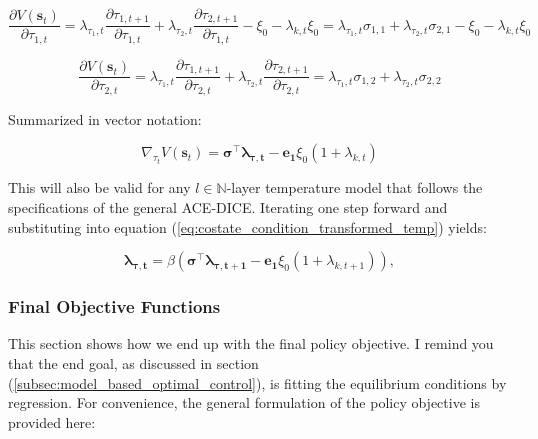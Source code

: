 \begin{equation*}
        \frac{\partial V(\bm{s}_t)}{\partial \tau_{1,t}} = 
            \lambda_{\tau_1,t}\frac{\partial \tau_{1,t+1}}{\partial \tau_{1,t}}
            + \lambda_{\tau_2,t}\frac{\partial \tau_{2,t+1}}{\partial \tau_{1,t}}
            -\xi_0 - \lambda_{k,t}\xi_0
        = \lambda_{\tau_1,t} \sigma_{1,1} + \lambda_{\tau_2,t} \sigma_{2,1}
        -\xi_0 - \lambda_{k,t}\xi_0
\end{equation*}

\begin{equation*}
        \frac{\partial V(\bm{s}_t)}{\partial \tau_{2,t}} = 
            \lambda_{\tau_1,t}\frac{\partial \tau_{1,t+1}}{\partial \tau_{2,t}}
            + \lambda_{\tau_2,t}\frac{\partial \tau_{2,t+1}}{\partial \tau_{2,t}}
        = \lambda_{\tau_1,t} \sigma_{1,2} + \lambda_{\tau_2,t} \sigma_{2,2}
\end{equation*}

Summarized in vector notation:

\begin{equation*}
    \nabla_{\tau_t}V(\bm{s}_t) = \bm{\sigma}^\top\bm{\lambda_{\tau, t}} - \bm{e_1}\xi_0(1 + \lambda_{k,t})
\end{equation*}

This will also be valid for any \(l\in\mathbb{N}\)-layer temperature model that follows the specifications of the general ACE-DICE. Iterating one step forward and substituting into equation (\ref{eq:costate_condition_transformed_temp}) yields:

\begin{equation}
        \bm{\lambda_{\tau, t}} = \beta \left( 
            \bm{\sigma}^\top\bm{\lambda_{\tau, t+1}} - \bm{e_1}\xi_0(1 + \lambda_{k,t+1})
        \right),
\label{eq:lagrange_condition_temperature_final}
\end{equation}



\subsubsection{Final Objective Functions}
This section shows how we end up with the final policy objective. I remind you that the end goal, as discussed in section (\ref{subsec:model_based_optimal_control}), is fitting the equilibrium conditions by regression. For convenience, the general formulation of the policy objective is provided here:

